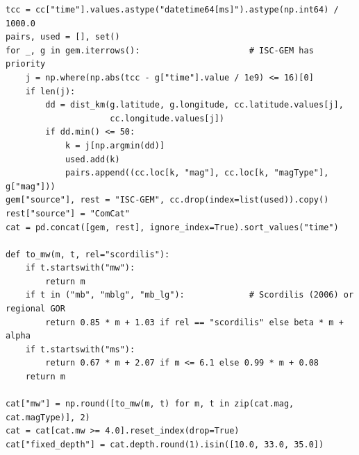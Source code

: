 \documentclass[11pt]{article}
\begin{document}
\begin{lstlisting}[caption={Merging of the ISC-GEM and ComCat records, removal of
duplicates within 16\,s and 50\,km and conversion of body-wave and surface-wave
magnitudes to $M_w$ (Python 3, pandas, NumPy; excerpt of analysis.py).},
label={lst:catalogue}]
tcc = cc["time"].values.astype("datetime64[ms]").astype(np.int64) / 1000.0
pairs, used = [], set()
for _, g in gem.iterrows():                      # ISC-GEM has priority
    j = np.where(np.abs(tcc - g["time"].value / 1e9) <= 16)[0]
    if len(j):
        dd = dist_km(g.latitude, g.longitude, cc.latitude.values[j],
                     cc.longitude.values[j])
        if dd.min() <= 50:
            k = j[np.argmin(dd)]
            used.add(k)
            pairs.append((cc.loc[k, "mag"], cc.loc[k, "magType"], g["mag"]))
gem["source"], rest = "ISC-GEM", cc.drop(index=list(used)).copy()
rest["source"] = "ComCat"
cat = pd.concat([gem, rest], ignore_index=True).sort_values("time")

def to_mw(m, t, rel="scordilis"):
    if t.startswith("mw"):
        return m
    if t in ("mb", "mblg", "mb_lg"):             # Scordilis (2006) or regional GOR
        return 0.85 * m + 1.03 if rel == "scordilis" else beta * m + alpha
    if t.startswith("ms"):
        return 0.67 * m + 2.07 if m <= 6.1 else 0.99 * m + 0.08
    return m

cat["mw"] = np.round([to_mw(m, t) for m, t in zip(cat.mag, cat.magType)], 2)
cat = cat[cat.mw >= 4.0].reset_index(drop=True)
cat["fixed_depth"] = cat.depth.round(1).isin([10.0, 33.0, 35.0])
\end{lstlisting}
\end{document}
